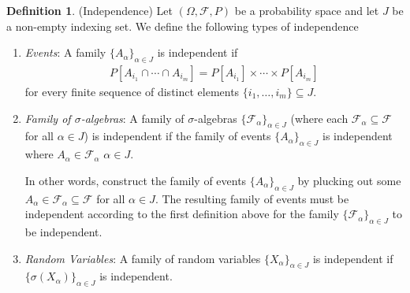 \documentclass[12pt]{article}
\theoremstyle{plain}
\theoremstyle{definition}
\newtheorem{defn}[thm]{Definition}
\theoremstyle{remark}
\newcommand{\sF}{\mathscr{F}}
\begin{document}
\begin{defn}(Independence)
Let $(\Omega,\sF,P)$ be a probability space and let $J$ be a non-empty
indexing set. We define the following types of independence
\begin{enumerate}
  \item \emph{Events}: A family $\{A_\alpha\}_{\alpha\in J}$ is
    independent if
    \begin{align*}
      P[A_{i_1} \cap \cdots \cap A_{i_m}]
      = P[A_{i_1}]\times \cdots \times P[A_{i_m}]
    \end{align*}
    for every finite sequence of distinct elements
    $\{i_1,\ldots,i_m\}\subseteq J$.

  \item \emph{Family of $\sigma$-algebras}: A family of
    $\sigma$-algebras $\{\sF_\alpha\}_{\alpha\in J}$
    (where each $\sF_\alpha\subseteq \sF$ for all $\alpha\in J$)
    is independent if the family of events
    $\{A_\alpha\}_{\alpha \in J}$ is independent where
    $A_{\alpha}\in \sF_{\alpha}$ $\alpha\in J$.

    In other words, construct the family of events
    $\{A_\alpha\}_{\alpha \in J}$ by plucking out some
    $A_\alpha \in \sF_\alpha\subseteq \sF$ for all $\alpha \in J$. The
    resulting family of events must be independent according to the
    first definition above for the family
    $\{\sF_\alpha\}_{\alpha \in J}$ to be independent.

  \item \emph{Random Variables}: A family of random variables
    $\{X_\alpha\}_{\alpha\in J}$ is independent if
    $\{\sigma(X_\alpha)\}_{\alpha \in J}$ is independent.
\end{enumerate}
\end{defn}
\end{document}
